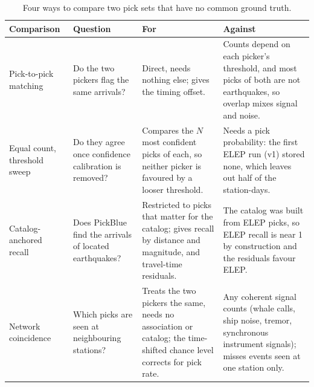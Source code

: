 \documentclass[]{seismica}
\begin{document}
\begin{table}[tp]
\centering
\small
\caption{Four ways to compare two pick sets that have no common ground truth.}
\label{tab:supp_pickcompare}
\begin{tabular}{>{\raggedright\arraybackslash}p{2.6cm}>{\raggedright\arraybackslash}p{4.0cm}>{\raggedright\arraybackslash}p{4.8cm}>{\raggedright\arraybackslash}p{4.8cm}}
\hline
Comparison & Question & For & Against \\
\hline
Pick-to-pick matching & Do the two pickers flag the same arrivals? & Direct, needs nothing else; gives the timing offset. & Counts depend on each picker's threshold, and most picks of both are not earthquakes, so overlap mixes signal and noise. \\
Equal count, threshold sweep & Do they agree once confidence calibration is removed? & Compares the $N$ most confident picks of each, so neither picker is favoured by a looser threshold. & Needs a pick probability: the first ELEP run (v1) stored none, which leaves out half of the station-days. \\
Catalog-anchored recall & Does PickBlue find the arrivals of located earthquakes? & Restricted to picks that matter for the catalog; gives recall by distance and magnitude, and travel-time residuals. & The catalog was built from ELEP picks, so ELEP recall is near 1 by construction and the residuals favour ELEP. \\
Network coincidence & Which picks are seen at neighbouring stations? & Treats the two pickers the same, needs no association or catalog; the time-shifted chance level corrects for pick rate. & Any coherent signal counts (whale calls, ship noise, tremor, synchronous instrument signals); misses events seen at one station only. \\
\hline
\end{tabular}
\end{table}
\end{document}
